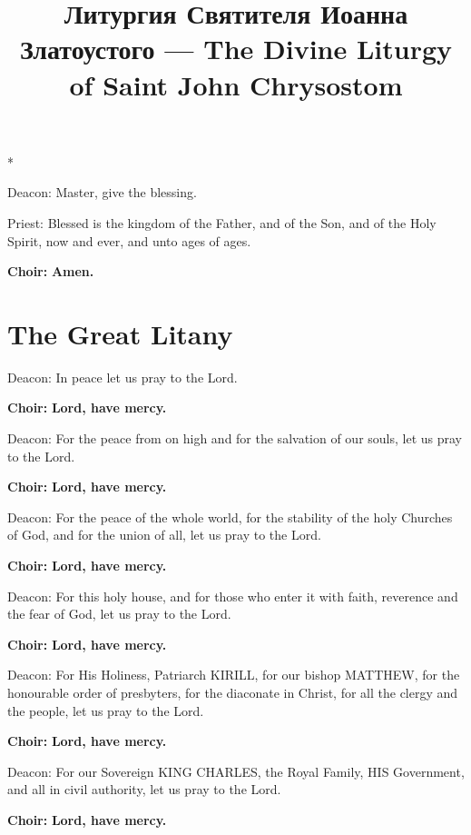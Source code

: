 \documentclass[12pt,a4paper,titlepage]{report}
\title {
  \selectlanguage{russian}Литургия Святителя Иоанна Златоустого ---
  \selectlanguage{english}The Divine Liturgy of Saint John Chrysostom
}
\author {}
\date{}
\begin{document}
\maketitle

\begin{paracol}[1]{2}
	
	\switchcolumn[0]*
	
	Deacon: Master, give the blessing.
	
	Priest: Blessed is the kingdom of the Father, and of the Son, and of the Holy Spirit, now and ever, and unto ages of ages.
	
	\textbf{Choir:} \textbf{Amen.}
	
	\section*{The Great Litany}
	
	Deacon: In peace let us pray to the Lord.
	
	\textbf{Choir:} \textbf{Lord, have mercy.}
	
	Deacon: For the peace from on high and for the salvation of our souls, let us pray to the Lord.
	
	\textbf{Choir:} \textbf{Lord, have mercy.}
	
	Deacon: For the peace of the whole world, for the stability of the holy Churches of God, and for the union of all, let us pray to the Lord.
	
	\textbf{Choir:} \textbf{Lord, have mercy.}
	
	Deacon: For this holy house, and for those who enter it with faith, reverence and the fear of God, let us pray to the Lord.
	
	\textbf{Choir:} \textbf{Lord, have mercy.}
	
	Deacon: For His Holiness, Patriarch KIRILL, for our bishop MATTHEW, for the honourable order of presbyters, for the diaconate in Christ, for all the clergy and the people, let us pray to the Lord.
	
	\textbf{Choir:} \textbf{Lord, have mercy.}
	
	Deacon: For our Sovereign KING CHARLES, the Royal Family, HIS Government, and all in civil authority, let us pray to the Lord.
	
	\textbf{Choir:} \textbf{Lord, have mercy.}
	

\end{paracol}
\end{document}
